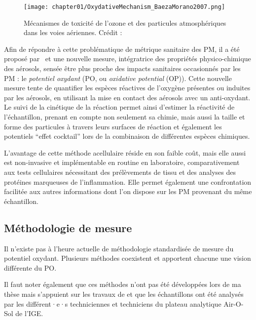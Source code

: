 \begin{figure}[ht]
    \centering
    \texttt{[image: chapter01/OxydativeMechanism\_BaezaMorano2007.png]}
    \caption{Mécanismes de toxicité de l’ozone et des particules atmosphériques dans les voies
    aériennes. Crédit : \cite[figure 1]{baezaPollution2007}}%
    \label{fig:mecanisme_oxydation}
\end{figure}

Afin de répondre à cette problématique de métrique sanitaire des PM, il a été proposé
par~\cite{zielinskiModeling1999} et \cite{choRedox2005} une nouvelle mesure, intégratrice
des propriétés physico-chimique des aérosols, sensée être plus proche des impacts
sanitaires occasionnés par les PM : le \textit{potentiel oxydant} (PO, ou
\textit{oxidative potential} (OP)).  Cette nouvelle mesure tente de quantifier les espèces
réactives de l'oxygène présentes ou induites par les aérosols, en utilisant la mise en
contact des aérosols avec un anti-oxydant.  Le suivi de la cinétique de la réaction permet
ainsi d'estimer la réactivité de l'échantillon, prenant en compte non seulement sa chimie,
mais aussi la taille et forme des particules à travers leurs surfaces de réaction et
également les potentiels ``effet cocktail'' lors de la combinaison de différentes espèces
chimiques.

L'avantage de cette méthode acellulaire réside en son faible coût, mais elle aussi est
non-invasive et implémentable en routine en laboratoire, comparativement aux tests
cellulaires nécessitant des prélèvements de tissu et des analyses des protéines marqueuses de
l'inflammation.  Elle permet également une confrontation facilitée aux autres informations
dont l'on dispose sur les PM provenant du même échantillon.

\subsection{Méthodologie de mesure}%
\label{sub:methodologie_de_mesure}

Il n'existe pas à l'heure actuelle de méthodologie standardisée de mesure du potentiel
oxydant. Plusieurs méthodes coexistent et apportent chacune une vision différente du PO.

Il faut noter également que ces méthodes n'ont pas été développées lors de ma thèse mais
s'appuient sur les travaux de \cite{calasPollution2017} et que les échantillons ont été
analysés par les différent·e·s techniciennes et techniciens du plateau analytique
Air-O-Sol de l'IGE.

